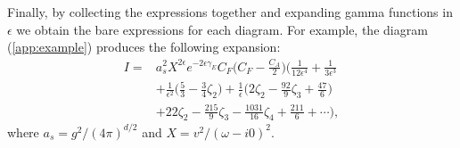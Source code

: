 \documentclass[aps,prl,twocolumn,secnumarabic,notitlepage,superscriptaddress,nofootinbib,tightenlines,floatfix,preprintnumbers]{revtex4-1}
\renewcommand{\(}{\left(}
\renewcommand{\)}{\right)}
\renewcommand{\[}{\left[}
\renewcommand{\]}{\right]}
\begin{document}
Finally, by collecting the expressions together and expanding gamma functions in $\epsilon$ we obtain the bare expressions for each diagram. For example, the diagram (\ref{app:example}) produces the following expansion:
\begin{equation}
\begin{split}
I=&a_s^2X^{2\epsilon}e^{-2\epsilon \gamma_E}C_F\Big(C_F-\frac{C_A}{2}\Big)\Bigg(\frac{1}{12 \epsilon ^4}+\frac{1}{3 \epsilon ^3}
\\ &
+\frac{1}{\epsilon ^2}\Big(\frac{5}{3}-\frac{3}{4}\zeta_2\Big)
+\frac{1}{\epsilon }\Big(2 \zeta_2-\frac{92}{9}\zeta_3+\frac{47}{6}\Big)
\\ &
+22 \zeta_2-\frac{215}{9}\zeta_3-\frac{1031}{16}\zeta_4+\frac{211}{6}+\cdots\Bigg),
\end{split}
\end{equation}
where $a_s=g^2/(4\pi)^{d/2}$ and $X=v^2/(\omega-i0)^2$.



\end{document}
